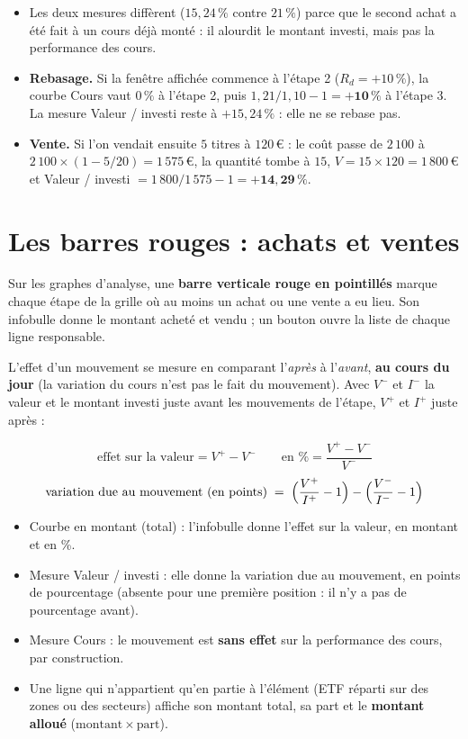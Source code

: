 \documentclass[11pt,a4paper]{article}
\begin{document}
\begin{itemize}
  \item Les deux mesures diffèrent ($15{,}24\,\%$ contre $21\,\%$) parce que le second achat a été fait à un cours
        déjà monté : il alourdit le montant investi, mais pas la performance des cours.
  \item \textbf{Rebasage.} Si la fenêtre affichée commence à l'étape 2 ($R_d=+10\,\%$), la courbe \og Cours \fg{}
        vaut $0\,\%$ à l'étape 2, puis $1{,}21/1{,}10-1=\mathbf{+10\,\%}$ à l'étape 3. La mesure \og Valeur / investi
        \fg{} reste à $+15{,}24\,\%$ : elle ne se rebase pas.
  \item \textbf{Vente.} Si l'on vendait ensuite $5$ titres à $120\,€$ : le coût passe de $2\,100$ à
        $2\,100\times(1-5/20)=1\,575\,€$, la quantité tombe à $15$, $V=15\times120=1\,800\,€$ et
        \og Valeur / investi \fg{} $=1\,800/1\,575-1=\mathbf{+14{,}29\,\%}$.
\end{itemize}

\section{Les barres rouges : achats et ventes}

Sur les graphes d'analyse, une \textbf{barre verticale rouge en pointillés} marque chaque étape de la grille où au
moins un achat ou une vente a eu lieu. Son infobulle donne le montant acheté et vendu ; un bouton ouvre la liste de
chaque ligne responsable.

L'effet d'un mouvement se mesure en comparant l'\emph{après} à l'\emph{avant}, \textbf{au cours du jour} (la variation
du cours n'est pas le fait du mouvement). Avec $V^{-}$ et $I^{-}$ la valeur et le montant investi juste avant les
mouvements de l'étape, $V^{+}$ et $I^{+}$ juste après :

\begin{formules}
\[
\text{effet sur la valeur} = V^{+}-V^{-}
\qquad
\text{en \%} = \frac{V^{+}-V^{-}}{V^{-}}
\]
\[
\text{variation due au mouvement (en points)} \;=\; \Bigl(\frac{V^{+}}{I^{+}}-1\Bigr)-\Bigl(\frac{V^{-}}{I^{-}}-1\Bigr)
\]
\end{formules}

\begin{itemize}
  \item Courbe en montant (total) : l'infobulle donne l'effet sur la valeur, en montant et en \%.
  \item Mesure \og Valeur / investi \fg{} : elle donne la variation due au mouvement, en points de pourcentage
        (absente pour une première position : il n'y a pas de pourcentage avant).
  \item Mesure \og Cours \fg{} : le mouvement est \textbf{sans effet} sur la performance des cours, par construction.
  \item Une ligne qui n'appartient qu'en partie à l'élément (ETF réparti sur des zones ou des secteurs) affiche son
        montant total, sa part et le \textbf{montant alloué} ($\text{montant}\times\mathrm{part}$).
\end{itemize}
\end{document}
